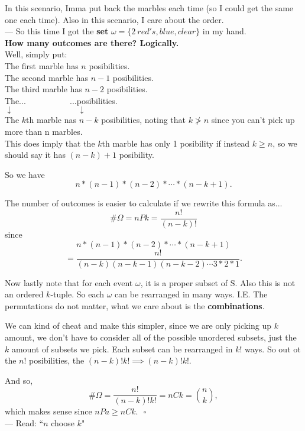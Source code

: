 \documentclass[12pt]{book}
\begin{document}
In this scenario, Imma put back the marbles each time (so I could get the same one each time). Also in this scenario, I care about the order. \\
--- So this time I got the \textbf{set} $\omega =\big\{2~red's, blue, clear\big\}$ in my hand.\\

\noindent \textbf{How many outcomes are there? Logically.} \\
Well, simply put:\\
The first marble has $n$ posibilities. \\
The second marble has $n-1$ posibilities.\\
The third marble has $n-2$ posibilities.\\
The...$~~~~~~~~~~~~~~~~~~~~~~~~$...posibilities.\\
$\downarrow ~~~~~~~~~~~~~~~~~~~~~~~~~~~~~~~~~~~\downarrow$\\
The $k$th marble nas $n-k$ posibilities, noting that $k\ngtr n$ since you can't pick up more than n marbles. \\
This does imply that the $k$th marble has only 1 posibility if instead $k\geq n$, so we should say it has $(n-k) + 1$ posibility.

So we have $$n*(n-1)*(n-2)* \cdots *(n-k+1).$$

The number of outcomes is easier to calculate if we rewrite this formula as...
$$\#\Omega = nPk = \frac{n!}{(n-k)!}$$
since 
$$n*(n-1)*(n-2)* \cdots *(n-k+1)$$
$$ = \frac{n!}{(n-k)(n-k-1)(n-k-2)\cdots 3*2*1}.$$

Now lastly note that for each event $\omega$, it is a proper subset of S. Also this is not an ordered $k$-tuple. So each $\omega$ can be rearranged in many ways. I.E. The permutations do not matter, what we care about is the \textbf{combinations}.

We can kind of cheat and make this simpler, since we are only picking up $k$ amount, we don't have to consider all of the possible unordered subsets, just the $k$ amount of subsets we pick. Each subset can be rearranged in $k!$ ways. So out ot the $n!$ posibilities, the $(n-k)!k! \implies (n-k)!k!$.

\noindent And so, 
$$\#\Omega = \frac{n!}{(n-k)!k!} = nCk ={n \choose k},$$
which makes sense since $nPa \geq nCk.~~~\square$\\
--- Read: ``$n$ choose $k$"
\end{document}
